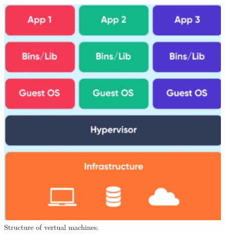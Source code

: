 \begin{figure}[htbp]
    \centering
    \includegraphics[width=0.4\linewidth]{figures/virtual_machine.png}
    \caption{Structure of vertual machines.}
    \label{fig:Virtual_Machine}
\end{figure}